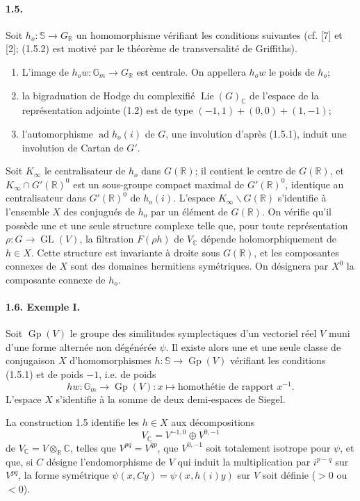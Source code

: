\documentclass[10pt]{article}
\newcommand{\C}{\mathbb C}
\newcommand{\Gm}{\mathbb G_m}
\newcommand{\R}{\mathbb R}
\newcommand{\bS}{\mathbb S}
\newcommand{\GL}{\operatorname{GL}}
\newcommand{\Gp}{\operatorname{Gp}}
\newcommand{\Lie}{\operatorname{Lie}}
\newcommand{\ad}{\operatorname{ad}}
\begin{document}
\paragraph{1.5.} Soit $h_o:\bS\to G_\R$ un homomorphisme vérifiant les conditions suivantes (cf. [7] et [2]; (1.5.2) est motivé par le théorème de transversalité de Griffiths).

\begin{enumerate}[label={(1.5.\arabic*)},leftmargin=3.0em]
\item L'image de $h_ow:\Gm\to G_\R$ est centrale. On appellera $h_ow$ le poids de $h_o$;
\item la bigraduation de Hodge du complexifié $\Lie(G)_\C$ de l'espace de la représentation adjointe (1.2) est de type $(-1,1)+(0,0)+(1,-1)$;
\item l'automorphisme $\ad h_o(i)$ de $G$, une involution d'après (1.5.1), induit une involution de Cartan de $G'$.
\end{enumerate}

Soit $K_\infty$ le centralisateur de $h_o$ dans $G(\R)$; il contient le centre de $G(\R)$, et $K_\infty\cap G'(\R)^0$ est un sous-groupe compact maximal de $G'(\R)^0$, identique au centralisateur dans $G'(\R)^0$ de $h_o(i)$. L'espace $K_\infty\backslash G(\R)$ s'identifie à l'ensemble $X$ des conjugués de $h_o$ par un élément de $G(\R)$. On vérifie qu'il possède une et une seule structure complexe telle que, pour toute représentation $\rho:G\to\GL(V)$, la filtration $F(\rho h)$ de $V_\C$ dépende holomorphiquement de $h\in X$. Cette structure est invariante à droite sous $G(\R)$, et les composantes connexes de $X$ sont des domaines hermitiens symétriques. On désignera par $X^0$ la composante connexe de $h_o$.

\paragraph{1.6. Exemple I.} Soit $\Gp(V)$ le groupe des similitudes symplectiques d'un vectoriel réel $V$ muni d'une forme alternée non dégénérée $\psi$. Il existe alors une et une seule classe de conjugaison $X$ d'homomorphismes $h:\bS\to\Gp(V)$ vérifiant les conditions (1.5.1) et de poids $-1$, i.e. de poids
\[
hw:\Gm\to\Gp(V):x\longmapsto\text{homothétie de rapport }x^{-1}.
\]
L'espace $X$ s'identifie à la somme de deux demi-espaces de Siegel.

La construction 1.5 identifie les $h\in X$ aux décompositions
\[
V_\C=V^{-1,0}\oplus V^{0,-1}
\]
de $V_\C=V\otimes_\R\C$, telles que $V^{pq}=\overline{V^{qp}}$, que $V^{0,-1}$ soit totalement isotrope pour $\psi$, et que, si $C$ désigne l'endomorphisme de $V$ qui induit la multiplication par $i^{p-q}$ sur $V^{pq}$, la forme symétrique $\psi(x,Cy)=\psi(x,h(i)y)$ sur $V$ soit définie ($>0$ ou $<0$).
\end{document}
